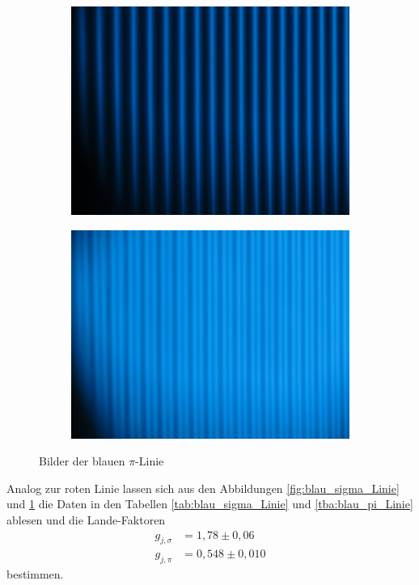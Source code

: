 \begin{figure}
  \centering
  \begin{subfigure}{0.4\textwidth}
    \centering
    \includegraphics[width=\textwidth]{Bilder/blau_pi_ohne_B.JPG}
  \end{subfigure}
  \begin{subfigure}{0.4\textwidth}
    \centering
    \includegraphics[width=\textwidth]{Bilder/blau_pi_mit_B.JPG}
  \end{subfigure}
  \caption{Bilder der blauen $\pi$-Linie}
  \label{fig:blau_pi_Linie}
\end{figure}
Analog zur roten Linie lassen sich aus den Abbildungen \ref{fig:blau_sigma_Linie} und \ref{fig:blau_pi_Linie} die Daten in den Tabellen \ref{tab:blau_sigma_Linie} und \ref{tba:blau_pi_Linie} ablesen
und die Lande-Faktoren
\begin{align}
  g_{j, \sigma} &= 1,78\pm 0,06\nonumber\\
  g_{j, \pi}    &= 0,548\pm 0,010
\end{align}
bestimmen.